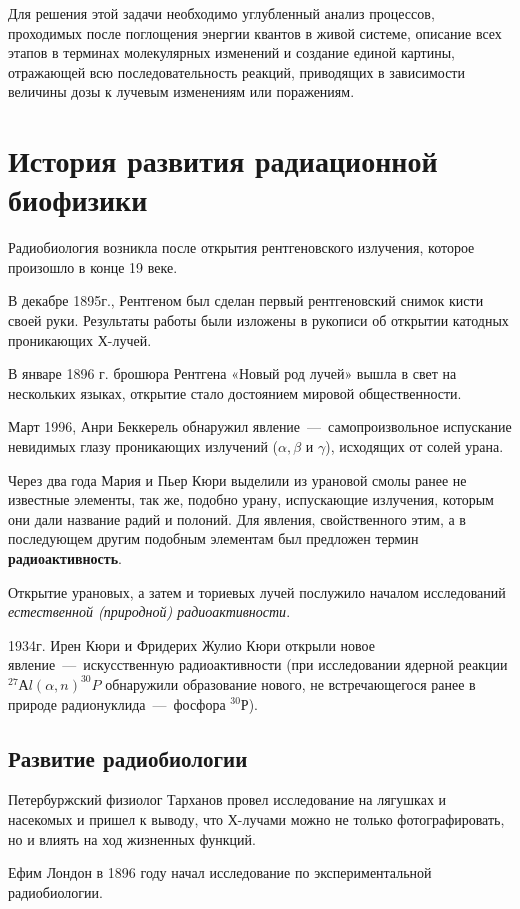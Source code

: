 \documentclass[a4paper, 14pt]{article}
\begin{document}
Для решения этой задачи необходимо углубленный анализ процессов,
проходимых после поглощения энергии квантов в живой системе, описание всех
этапов в терминах молекулярных изменений и создание единой картины, отражающей
всю последовательность реакций, приводящих в зависимости величины дозы к
лучевым изменениям или поражениям.

\section{История развития радиационной биофизики}
Радиобиология возникла после открытия рентгеновского излучения, которое
произошло в конце 19 веке.

В декабре 1895г., Рентгеном был сделан первый рентгеновский снимок кисти своей руки. Результаты работы были изложены в рукописи об открытии катодных проникающих Х-лучей.

В январе 1896 г. брошюра Рентгена «Новый род лучей» вышла в свет на
нескольких языках, открытие стало достоянием мировой общественности.

Март 1996, Анри Беккерель обнаружил явление~---~самопроизвольное испускание
невидимых глазу проникающих излучений ($\alpha, \beta$ и $\gamma$), исходящих от солей урана.

Через два года Мария и Пьер Кюри выделили из урановой смолы ранее не
известные элементы, так же, подобно урану, испускающие излучения, которым они
дали название радий и полоний. Для явления, свойственного этим, а в последующем
другим подобным элементам был предложен термин \textbf{радиоактивность}.

Открытие урановых, а затем и ториевых лучей послужило началом
исследований \textit{естественной (природной) радиоактивности}.

1934г. Ирен Кюри и Фридерих Жулио Кюри открыли новое явление~---~искусственную радиоактивности (при исследовании ядерной реакции $^{27}Аl(\alpha,n)^{30}P$ %
обнаружили образование нового, не встречающегося ранее в природе радионуклида~---~фосфора $^{30}Р$).

\subsection{Развитие радиобиологии}
Петербуржский физиолог Тарханов провел исследование на лягушках и
насекомых и пришел к выводу, что Х-лучами можно не только фотографировать, но и
влиять на ход жизненных функций.

Ефим Лондон в 1896 году начал исследование по экспериментальной
радиобиологии.
\end{document}
